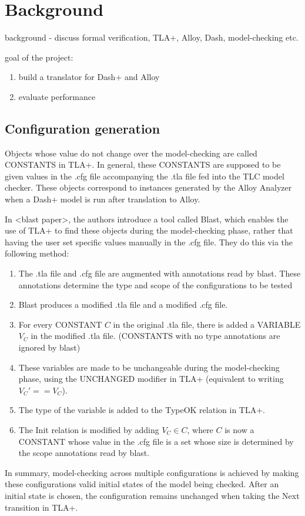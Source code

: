 \chapter{Background}


background - discuss formal verification, TLA+, Alloy, Dash, model-checking etc.

goal of the project:

\begin{enumerate}
	\item build a translator for Dash+ and Alloy
	\item evaluate performance
\end{enumerate}


\section{Configuration generation}


Objects whose value do not change over the model-checking are called CONSTANTS in TLA+. In general, these CONSTANTS are supposed to be given values in the .cfg file accompanying the .tla file fed into the TLC model checker. These objects correspond to instances generated by the Alloy Analyzer when a Dash+ model is run after translation to Alloy.

In <blast paper>, the authors introduce a tool called Blast, which enables the use of TLA+ to find these objects during the model-checking phase, rather that having the user set specific values manually in the .cfg file. They do this via the following method:

\begin{enumerate}
	\item The .tla file and .cfg file are augmented with annotations read by blast. These annotations determine the type and scope of the configurations to be tested
	\item Blast produces a modified .tla file and a modified .cfg file.
	\item For every CONSTANT $C$ in the original .tla file, there is added a VARIABLE $V_{C}$ in the modified .tla file. (CONSTANTS with no type annotations are ignored by blast)
	\item These variables are made to be unchangeable during the model-checking phase, using the UNCHANGED modifier in TLA+ (equivalent to writing $V_{C}' == V_{C}$).
	\item The type of the variable is added to the TypeOK relation in TLA+.
	\item The Init relation is modified by adding $V_{C} \in C$, where $C$ is now a CONSTANT whose value in the .cfg file is a set whose size is determined by the scope annotations read by blast.
\end{enumerate}

In summary, model-checking across multiple configurations is achieved by making these configurations valid initial states of the model being checked. After an initial state is chosen, the configuration remains unchanged when taking the Next transition in TLA+.

